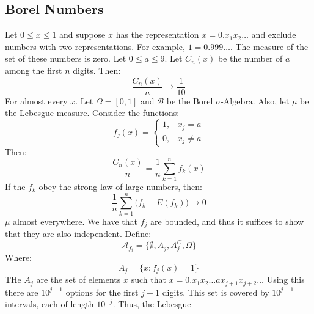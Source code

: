     \subsection{Borel Numbers}
        Let $0\leq{x}\leq{1}$ and suppose $x$ has the
        representation $x=0.x_{1}x_{2}\dots$ and exclude
        numbers with two representations. For example,
        $1=0.999\dots$. The measure of the set of these numbers
        is zero. Let $0\leq{a}\leq{9}$. Let $C_{n}(x)$ be
        the number of $a$ among the first $n$ digits. Then:
        \begin{equation}
            \frac{C_{n}(x)}{n}\rightarrow\frac{1}{10}
        \end{equation}
        For almost every $x$. Let $\Omega=[0,1]$ and
        $\mathcal{B}$ be the Borel $\sigma\textrm{-Algebra}$.
        Also, let $\mu$ be the Lebesgue measure. Consider
        the functions:
        \begin{equation}
            f_{j}(x)=
            \begin{cases}
                1,&x_{j}=a\\
                0,&x_{j}\ne{a}
            \end{cases}
        \end{equation}
        Then:
        \begin{equation}
            \frac{C_{n}(x)}{n}=\frac{1}{n}\sum_{k=1}^{n}
                f_{k}(x)
        \end{equation}
        If the $f_{k}$ obey the strong law of large numbers,
        then:
        \begin{equation}
            \frac{1}{n}\sum_{k=1}^{n}\big(f_{k}-E(f_{k})\big)
            \rightarrow{0}
        \end{equation}
        $\mu$ almost everywhere. We have that $f_{j}$ are
        bounded, and thus it suffices to show that they are
        also independent. Define:
        \begin{equation}
            \mathcal{A}_{f_{i}}=
            \{\emptyset,A_{j},A_{j}^{C},\Omega\}
        \end{equation}
        Where:
        \begin{equation}
            A_{j}=\{x:f_{j}(x)=1\}
        \end{equation}
        THe $A_{j}$ are the set of elements $x$ such that
        $x=0.x_{1}x_{2}\dots{a}x_{j+1}x_{j+2}\dots$ Using this
        there are $10^{j-1}$ options for the first $j-1$
        digits. This set is covered by $10^{j-1}$ intervals,
        each of length $10^{\minus{j}}$. Thus, the Lebesgue
